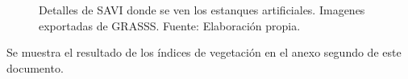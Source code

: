 \begin{figure}
	\centering
	\caption[Detalle de estanques en SAVI]{Detalles de SAVI donde se ven los estanques artificiales. Imagenes exportadas de GRASSS. Fuente: Elaboración propia.}
	\label{fig:detalle_estanques}
\end{figure}

Se muestra el resultado de los índices de vegetación en el anexo segundo de este documento.